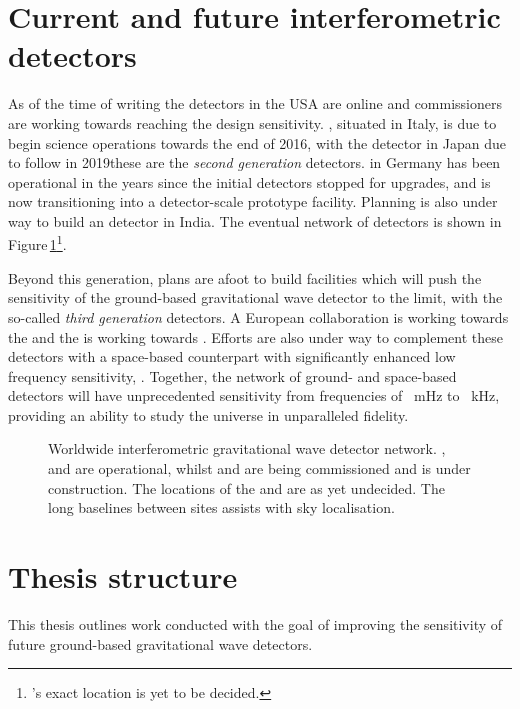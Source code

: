 \section{Current and future interferometric detectors}
As of the time of writing the \ALIGO{} detectors in the USA are online and commissioners are working towards reaching the design sensitivity. \AVIRGO{}, situated in Italy, is due to begin science operations towards the end of 2016, with the \KAGRA{} detector in Japan due to follow in 2019\textemdash these are the \emph{second generation} detectors. \GEO{} in Germany has been operational in the years since the initial detectors stopped for upgrades, and is now transitioning into a detector-scale prototype facility. Planning is also under way to build an \ALIGO{} detector in India. The eventual network of detectors is shown in Figure\,\ref{fig:detector-network}\footnote{\INDIGO{}'s exact location is yet to be decided.}.

Beyond this generation, plans are afoot to build facilities which will push the sensitivity of the ground-based gravitational wave detector to the limit, with the so-called \emph{third generation} detectors. A European collaboration is working towards the \emph{\ET{}} \cite{ET2011} and the \LSC{} is working towards \emph{\LIGOCE{}} \cite{Dwyer2015, aligocosmic2016}. Efforts are also under way to complement these detectors with a space-based counterpart with significantly enhanced low frequency sensitivity, \emph{\ELISA{}} \cite{Amaro-Seoane2012}. Together, the network of ground- and space-based detectors will have unprecedented sensitivity from frequencies of \SI{}{\milli\hertz} to \SI{}{\kilo\hertz}, providing an ability to study the universe in unparalleled fidelity.

\begin{figure}
  \centering
  
  \caption[Worldwide interferometric gravitational wave detector network]{\label{fig:detector-network}Worldwide interferometric gravitational wave detector network. \GEO{}, \LHO{} and \LLO{} are operational, whilst \VIRGO{} and \KAGRA{} are being commissioned and \INDIGO{} is under construction. The locations of the \ET{} and \LIGOCE{} are as yet undecided. The long baselines between sites assists with sky localisation.}
\end{figure}

\section{Thesis structure}
This thesis outlines work conducted with the goal of improving the sensitivity of future ground-based gravitational wave detectors.

